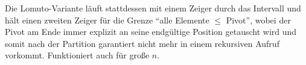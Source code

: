 \documentclass{scrartcl}
\begin{document}
\inputminted[breaklines]{python3}{quicksort.py}

Die Lomuto-Variante läuft stattdessen mit einem Zeiger durch das Intervall und hält einen zweiten Zeiger für die Grenze “alle Elemente $\leq$  Pivot”, wobei der Pivot am Ende immer explizit an seine endgültige Position getauscht wird und somit nach der Partition garantiert nicht mehr in einem rekursiven Aufruf vorkommt. Funktioniert auch für große $n$.

\inputminted[breaklines]{python3}{quicksort_lomuto.py}

%
%

\listoffigures
\end{document}

